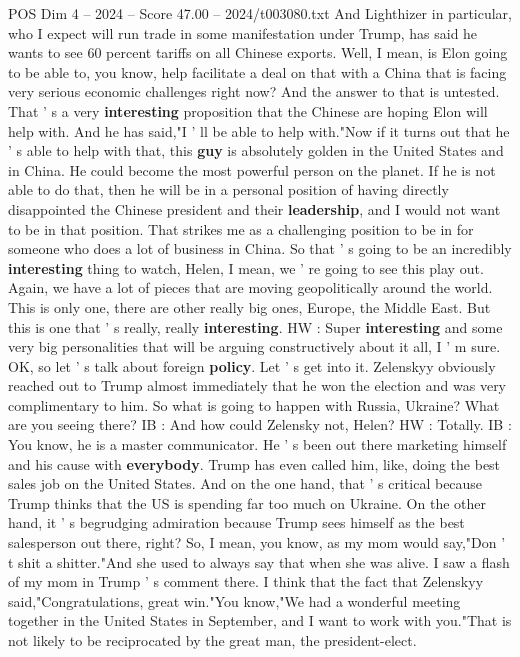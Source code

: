 \begin{textsample}{POS Dim 4 – 2024 – Score 47.00 – 2024/t003080.txt}
And Lighthizer in particular, who I expect will run trade in some manifestation under Trump, has said he wants to see 60 percent tariffs on all Chinese exports.
Well, I mean, is Elon going to be able to, you know, help facilitate a deal on that with a China that is facing very serious economic challenges right now?
And the answer to that is untested.
That ' s a very \textbf{interesting} proposition that the Chinese are hoping Elon will help with.
And he has said,"I ' ll be able to help with."Now if it turns out that he ' s able to help with that, this \textbf{guy} is absolutely golden in the United States and in China.
He could become the most powerful person on the planet.
If he is not able to do that, then he will be in a personal position of having directly disappointed the Chinese president and their \textbf{leadership}, and I would not want to be in that position.
That strikes me as a challenging position to be in for someone who does a lot of business in China.
So that ' s going to be an incredibly \textbf{interesting} thing to watch, Helen, I mean, we ' re going to see this play out.
Again, we have a lot of pieces that are moving geopolitically around the world.
This is only one, there are other really big ones, Europe, the Middle East.
But this is one that ' s really, really \textbf{interesting}.
HW : Super \textbf{interesting} and some very big personalities that will be arguing constructively about it all, I ' m sure.
OK, so let ' s talk about foreign \textbf{policy}.
Let ' s get into it.
Zelenskyy obviously reached out to Trump almost immediately that he won the election and was very complimentary to him.
So what is going to happen with Russia, Ukraine?
What are you seeing there?
IB : And how could Zelensky not, Helen?
HW : Totally.
IB : You know, he is a master communicator.
He ' s been out there marketing himself and his cause with \textbf{everybody}.
Trump has even called him, like, doing the best sales job on the United States.
And on the one hand, that ' s critical because Trump thinks that the US is spending far too much on Ukraine.
On the other hand, it ' s begrudging admiration because Trump sees himself as the best salesperson out there, right?
So, I mean, you know, as my mom would say,"Don ' t shit a shitter."And she used to always say that when she was alive.
I saw a flash of my mom in Trump ' s comment there.
I think that the fact that Zelenskyy said,"Congratulations, great win."You know,"We had a wonderful meeting together in the United States in September, and I want to work with you."That is not likely to be reciprocated by the great man, the president-elect.

\end{textsample}
